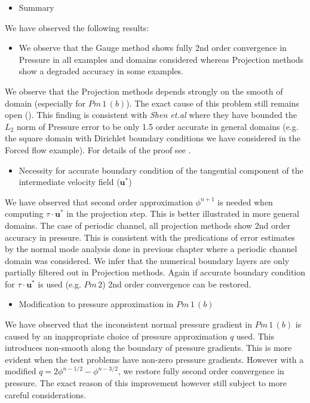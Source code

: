 \begin{itemize}
\item Summary
\end{itemize}
We have observed the following results:
\begin{itemize}
\item We observe that the Gauge method shows fully 2nd order convergence in Pressure in all examples and domains considered whereas Projection methods show a degraded accuracy in some examples. 
\end{itemize}
We observe that the Projection methods depends strongly on the smooth of domain (especially for $Pm\,1\,(b)$). The exact cause of this problem still remains open (\cite{guermond2004error}). This finding is consistent with \emph{Shen et.al} where they have bounded the $L_2$ norm of Pressure error to be only 1.5 order accurate in general domains (e.g. the square domain with Dirichlet boundary conditions we have considered in the Forced flow example). For details of the proof see \cite{guermond2004error, pyo2005normal}.

\begin{itemize}
\item Necessity for accurate boundary condition of the tangential component of the intermediate velocity field ($\textbf{u}^*$)
\end{itemize}
We have observed that second order approximation $\phi^{n+1}$ is needed when computing $\textbf{$\tau$}\cdot\textbf{u}^*$ in the projection step. This is better illustrated in more general domains. The case of periodic channel, all projection methods show 2nd order accuracy in pressure. This is consistent with the predications of error estimates by the normal mode analysis done in previous chapter where a periodic channel domain was considered. We infer that the numerical boundary layers are only partially filtered out in Projection methods. Again if accurate boundary condition for $\textbf{$\tau$}\cdot\textbf{u}^*$ is used (e.g. $Pm\,2$) 2nd order convergence can be restored.


\begin{itemize}
\item Modification to pressure approximation in $Pm\,1\,(b)$
\end{itemize}
We have observed that the inconsistent normal pressure gradient in $Pm\,1\,(b)$ is caused by an inappropriate choice of pressure approximation $q$ used. This introduces non-smooth along the boundary of pressure gradients. This is more evident when the test problems have non-zero pressure gradients. However with a modified $q = 2\phi^{n-1/2} - \phi^{n-3/2}$, we restore fully second order convergence in pressure. The exact reason of this improvement however still subject to more careful considerations.

